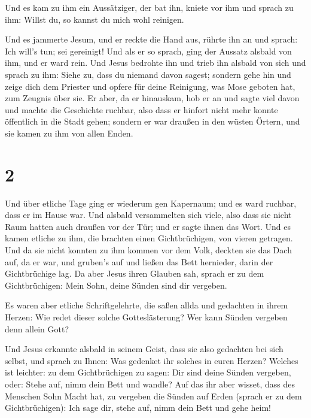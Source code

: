  Und es kam zu ihm ein Aussätziger, der bat ihn, kniete
vor ihm und sprach zu ihm: Willst du, so kannst du mich wohl reinigen.

 Und es jammerte Jesum, und er reckte die Hand aus,
rührte ihn an und sprach: Ich will's tun; sei gereinigt! 
Und als er so sprach, ging der Aussatz alsbald von ihm, und er ward
rein.  Und Jesus bedrohte ihn und trieb ihn alsbald von
sich  und sprach zu ihm: Siehe zu, dass du niemand davon
sagest; sondern gehe hin und zeige dich dem Priester und opfere für
deine Reinigung, was Mose geboten hat, zum Zeugnis über sie.
 Er aber, da er hinauskam, hob er an und sagte viel davon
und machte die Geschichte ruchbar, also dass er hinfort nicht mehr
konnte öffentlich in die Stadt gehen; sondern er war draußen in den
wüsten Örtern, und sie kamen zu ihm von allen Enden.

\hypertarget{section-1}{%
\section{2}\label{section-1}}

 Und über etliche Tage ging er wiederum gen Kapernaum; und
es ward ruchbar, dass er im Hause war.  Und alsbald
versammelten sich viele, also dass sie nicht Raum hatten auch draußen
vor der Tür; und er sagte ihnen das Wort.  Und es kamen
etliche zu ihm, die brachten einen Gichtbrüchigen, von vieren getragen.
 Und da sie nicht konnten zu ihm kommen vor dem Volk,
deckten sie das Dach auf, da er war, und gruben's auf und ließen das
Bett hernieder, darin der Gichtbrüchige lag.  Da aber
Jesus ihren Glauben sah, sprach er zu dem Gichtbrüchigen: Mein Sohn,
deine Sünden sind dir vergeben.

 Es waren aber etliche Schriftgelehrte, die saßen allda
und gedachten in ihrem Herzen:  Wie redet dieser solche
Gotteslästerung? Wer kann Sünden vergeben denn allein Gott?

 Und Jesus erkannte alsbald in seinem Geist, dass sie also
gedachten bei sich selbst, und sprach zu Ihnen: Was gedenket ihr solches
in euren Herzen?  Welches ist leichter: zu dem
Gichtbrüchigen zu sagen: Dir sind deine Sünden vergeben, oder: Stehe
auf, nimm dein Bett und wandle?  Auf das ihr aber wisset,
dass des Menschen Sohn Macht hat, zu vergeben die Sünden auf Erden
(sprach er zu dem Gichtbrüchigen):  Ich sage dir, stehe
auf, nimm dein Bett und gehe heim!

